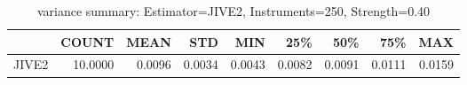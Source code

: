 \begin{table}[ht]
\centering
\caption{variance summary: Estimator=JIVE2, Instruments=250, Strength=0.40}
\begin{tabular}{lrrrrrrrr}
\toprule
 & COUNT & MEAN & STD & MIN & 25\% & 50\% & 75\% & MAX \\
\midrule
JIVE2 & 10.0000 & 0.0096 & 0.0034 & 0.0043 & 0.0082 & 0.0091 & 0.0111 & 0.0159 \\
\bottomrule
\end{tabular}
\end{table}
